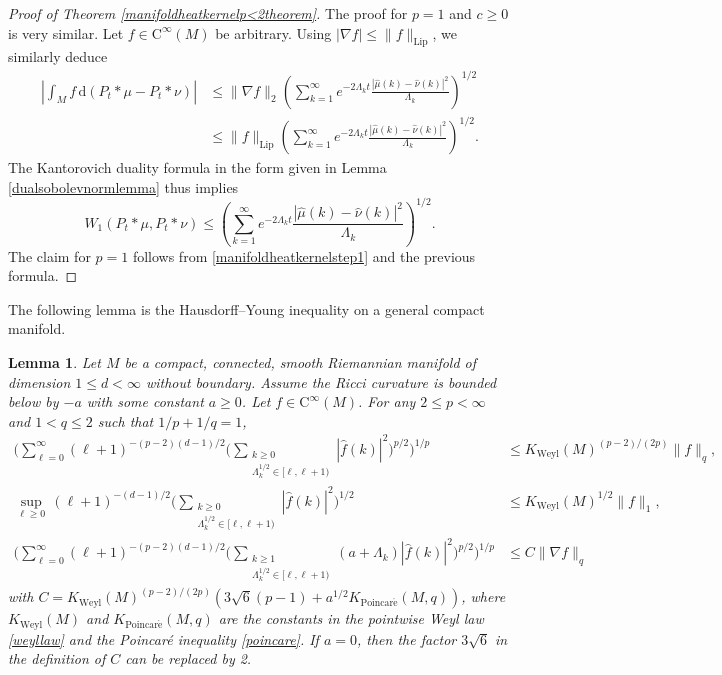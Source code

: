\documentclass[11pt,a4paper]{article}
\newtheorem{lem}[thm]{Lemma}
\theoremstyle{definition}
\begin{document}
\begin{proof}[Proof of Theorem \ref{manifoldheatkernelp<2theorem}]
The proof for $p=1$ and $c \ge 0$ is very similar. Let $f \in \mathrm{C}^{\infty}(M)$ be arbitrary. Using $|\nabla f| \le \| f \|_{\mathrm{Lip}}$, we similarly deduce
\[ \begin{split} \left| \int_M f \, \mathrm{d}(P_t * \mu - P_t * \nu) \right| &\le \| \nabla f \|_2 \left( \sum_{k=1}^{\infty} e^{-2 \Lambda_k t} \frac{|\widehat{\mu}(k) - \widehat{\nu}(k)|^2}{\Lambda_k} \right)^{1/2} \\ &\le \| f \|_{\mathrm{Lip}} \left( \sum_{k=1}^{\infty} e^{-2 \Lambda_k t} \frac{|\widehat{\mu}(k) - \widehat{\nu}(k)|^2}{\Lambda_k} \right)^{1/2} . \end{split} \]
The Kantorovich duality formula in the form given in Lemma \ref{dualsobolevnormlemma} thus implies
\[ W_1 (P_t * \mu, P_t* \nu) \le \left( \sum_{k=1}^{\infty} e^{-2 \Lambda_k t} \frac{|\widehat{\mu}(k) - \widehat{\nu}(k)|^2}{\Lambda_k} \right)^{1/2} . \]
The claim for $p=1$ follows from \eqref{manifoldheatkernelstep1} and the previous formula.
\end{proof}

The following lemma is the Hausdorff--Young inequality on a general compact manifold.
\begin{lem}\label{manifoldhausdorffyounglemma} Let $M$ be a compact, connected, smooth Riemannian manifold of dimension $1 \le d < \infty$ without boundary. Assume the Ricci curvature is bounded below by $-a$ with some constant $a \ge 0$. Let $f \in \mathrm{C}^{\infty}(M)$. For any $2 \le p < \infty$ and $1<q \le 2$ such that $1/p+1/q=1$,
\begin{align}
\Bigg( \sum_{\ell=0}^{\infty} (\ell+1)^{-(p-2)(d-1)/2} \Bigg( \sum_{\substack{k \ge 0 \\ \Lambda_k^{1/2} \in [\ell, \ell+1)}} |\widehat{f}(k)|^2 \Bigg)^{p/2} \Bigg)^{1/p} &\le K_{\mathrm{Weyl}}(M)^{(p-2)/(2p)} \| f \|_q , \label{manifoldHY1} \\ \sup_{\ell \ge 0} \, (\ell+1)^{-(d-1)/2} \Bigg( \sum_{\substack{k \ge 0 \\ \Lambda_k^{1/2} \in [\ell, \ell+1)}} |\widehat{f}(k)|^2 \Bigg)^{1/2} &\le K_{\mathrm{Weyl}}(M)^{1/2} \| f \|_1 , \label{manifoldHY2} \\ \Bigg( \sum_{\ell=0}^{\infty} (\ell+1)^{-(p-2)(d-1)/2} \Bigg( \sum_{\substack{k \ge 1 \\ \Lambda_k^{1/2} \in [\ell, \ell+1)}} (a+\Lambda_k) |\widehat{f}(k)|^2 \Bigg)^{p/2} \Bigg)^{1/p} &\le C \| \nabla f \|_q \label{manifoldHY3}
\end{align}
with $C=K_{\mathrm{Weyl}}(M)^{(p-2)/(2p)} (3 \sqrt{6} (p-1) + a^{1/2} K_{\mathrm{Poincar\acute{e}}}(M,q))$, where $K_{\mathrm{Weyl}}(M)$ and $K_{\mathrm{Poincar\acute{e}}}(M,q)$ are the constants in the pointwise Weyl law \eqref{weyllaw} and the Poincar\'e inequality \eqref{poincare}. If $a=0$, then the factor $3\sqrt{6}$ in the definition of $C$ can be replaced by 2.
\end{lem}
\end{document}
